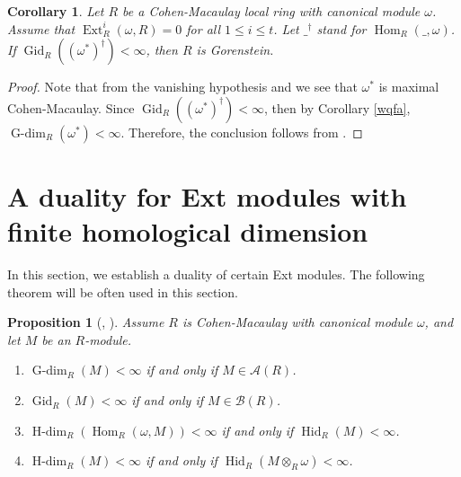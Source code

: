 \documentclass[11pt, a4paper,pagebackref]{amsart}
\numberwithin{equation}{section}
\newtheorem{proposition}[theorem]{Proposition}
\newtheorem{corollary}[theorem]{Corollary}
\theoremstyle{definition}
\newtheorem{remark and definition}[theorem]{Remark and Definition}
\newtheorem{remark and notation}[theorem]{Remark and Notation}
\newcommand\Hom{\operatorname{Hom}}
\newcommand\Ext{\operatorname{Ext}}
\begin{document}
\begin{corollary}\label{newGor}
    Let $R$ be a Cohen-Macaulay local ring with canonical module $\omega$. Assume that $\Ext_R^i(\omega, R)=0$ for all $1\leq i \leq t$. Let $\_^\dagger$ stand for $\Hom_R(\_,\omega)$.  If  $\operatorname{Gid}_R((\omega^*)^\dagger)<\infty$, then $R$ is Gorenstein. 
\end{corollary}
\begin{proof}
Note that from the vanishing hypothesis and \cite[Theorem 2.1(i)]{VanishingOf(Co)homologyfrenessCriteriaAndTheAuslanderReitenConjectureforCohen-MacaulayBurch} we see that $\omega^*$ is maximal Cohen-Macaulay. Since  $\operatorname{Gid}_R((\omega^*)^\dagger)<\infty$, then by Corollary \ref{wqfa}, $\operatorname{G-dim}_R(\omega^\ast)<\infty$. Therefore, the conclusion follows from \cite[Corollary 5.13]{OnModulesWhoseDualIsOfFiniteGorensteinDimension}. 
\end{proof}


\section{A duality for Ext modules with finite homological dimension}

\label{sectionduality}


In this section, we establish a duality of certain Ext modules. The following theorem will be often used in this section.

\begin{proposition}[{\cite[Theorem 4.4]{OnGorensteinProjectiveInjectiveAndFlatDimensionsAFunctorialDescriptionWithApplications}, \cite[Corollary 3.1.11 \& Theorem 3.4.11]{GorensteinDimensions}
}] \label{GdimCrs} 
    Assume $R$ is Cohen-Macaulay with canonical module $\omega$, and let $M$ be an $R$-module. 
    \begin{enumerate}[\rm(1)]
        \item $\operatorname{G-dim}_R(M)<\infty$ if and only if $M \in \mathcal{A}(R)$. 
        \item $\operatorname{Gid}_R(M)<\infty$ if and only if $M \in \mathcal{B}(R)$.
        \item $\operatorname{H-dim}_R(\Hom_R(\omega, M))<\infty$ if and only if $\operatorname{Hid}_R(M)<\infty$.
        \item $\operatorname{H-dim}_R(M)<\infty$ if and only if $\operatorname{Hid}_R(M\otimes_R \omega)<\infty$. 
    \end{enumerate}
\end{proposition}
\end{document}

